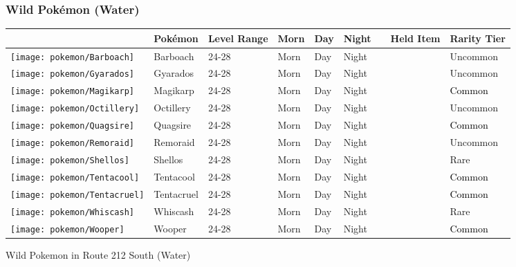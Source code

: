 \subsubsection{Wild Pokémon (Water)}%
\label{ssubsec:WildPokmon(Water)}%
\begin{longtable}{||l l l l l l l l l||}%
\hline%
\rowcolor{WaterColor}%
&Pokémon&Level Range&Morn&Day&Night&&Held Item&Rarity Tier\\%
\hline%
\endhead%
\hline%
\rowcolor{WaterColor}%
\texttt{[image: pokemon/Barboach]}&Barboach&24{-}28&Morn&Day&Night&&&\textcolor{OliveGreen}{%
Uncommon%
}\\%
\hline%
\rowcolor{WaterColor}%
\texttt{[image: pokemon/Gyarados]}&Gyarados&24{-}28&Morn&Day&Night&&&\textcolor{OliveGreen}{%
Uncommon%
}\\%
\hline%
\rowcolor{WaterColor}%
\texttt{[image: pokemon/Magikarp]}&Magikarp&24{-}28&Morn&Day&Night&&&\textcolor{black}{%
Common%
}\\%
\hline%
\rowcolor{WaterColor}%
\texttt{[image: pokemon/Octillery]}&Octillery&24{-}28&Morn&Day&Night&&&\textcolor{OliveGreen}{%
Uncommon%
}\\%
\hline%
\rowcolor{WaterColor}%
\texttt{[image: pokemon/Quagsire]}&Quagsire&24{-}28&Morn&Day&Night&&&\textcolor{black}{%
Common%
}\\%
\hline%
\rowcolor{WaterColor}%
\texttt{[image: pokemon/Remoraid]}&Remoraid&24{-}28&Morn&Day&Night&&&\textcolor{OliveGreen}{%
Uncommon%
}\\%
\hline%
\rowcolor{WaterColor}%
\texttt{[image: pokemon/Shellos]}&Shellos&24{-}28&Morn&Day&Night&&&\textcolor{RedOrange}{%
Rare%
}\\%
\hline%
\rowcolor{WaterColor}%
\texttt{[image: pokemon/Tentacool]}&Tentacool&24{-}28&Morn&Day&Night&&&\textcolor{black}{%
Common%
}\\%
\hline%
\rowcolor{WaterColor}%
\texttt{[image: pokemon/Tentacruel]}&Tentacruel&24{-}28&Morn&Day&Night&&&\textcolor{black}{%
Common%
}\\%
\hline%
\rowcolor{WaterColor}%
\texttt{[image: pokemon/Whiscash]}&Whiscash&24{-}28&Morn&Day&Night&&&\textcolor{RedOrange}{%
Rare%
}\\%
\hline%
\rowcolor{WaterColor}%
\texttt{[image: pokemon/Wooper]}&Wooper&24{-}28&Morn&Day&Night&&&\textcolor{black}{%
Common%
}\\%
\hline%
\end{longtable}%
\caption{Wild Pokemon in Route 212 South (Water)}
